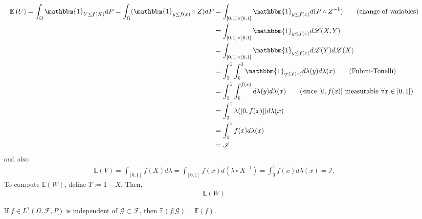 \documentclass[11pt, letterpaper]{article}
\newcommand{\ex}[1]{\mathbb{E}\left(#1\right)}
\newcommand{\mbb}[1]{\mathbb{#1}}
\newcommand{\mc}[1]{\mathcal{#1}}
\begin{document}
    \begin{align*}
        \ex{U}=\int_{\Omega}\mathbbm{1}_{Y\leq f(X)}dP=\int_{\Omega}(\mathbbm{1}_{y\leq f(x)}\circ Z)dP&=\int_{[0,1]\times[0,1]}\mathbbm{1}_{y\leq f(x)}d(P\circ Z^{-1})\tag{change of variables}\\
        &=\int_{[0,1]\times[0,1]}\mathbbm{1}_{y\leq f(x)}d\mc{L}(X,Y)\\
        &=\int_{[0,1]\times[0,1]}\mathbbm{1}_{y\leq f(x)}d\mc{L}(Y)d\mc{L}(X)\\
        &=\int_0^1\int_0^1\mathbbm{1}_{y\leq f(x)}d\lambda(y)d\lambda(x)\tag{Fubini-Tonelli}\\
        &=\int_0^1\int_{0}^{f(x)}d\lambda(y)d\lambda(x)\tag{since $[0,f(x)]$ measurable $\forall x\in[0,1]$}\\
        &=\int_0^1\lambda([0,f(x)])d\lambda(x)\\
        &=\int_{0}^1f(x)d\lambda(x)\\
        &=\mc{I}
    \end{align*}
    and also
    \begin{align*}
        \ex{V}=\int_{[0,1]}f(X)d\lambda=\int_{[0,1]}f(x)d(\lambda\circ X^{-1})=\int_0^1f(x)d\lambda(x)=\mc{I}.
    \end{align*}
    To compute $\ex{W}$, define $T:=1-X$. Then,
    \begin{align*}
        \ex{W}
    \end{align*}

    If $f\in L^1(\Omega,\mc{F},P)$ is independent of $\mc{G}\subset\mc{F}$, then $\mbb{E}(f|\mc{G})=\mbb{E}(f)$.
    
    
    
\end{document}
